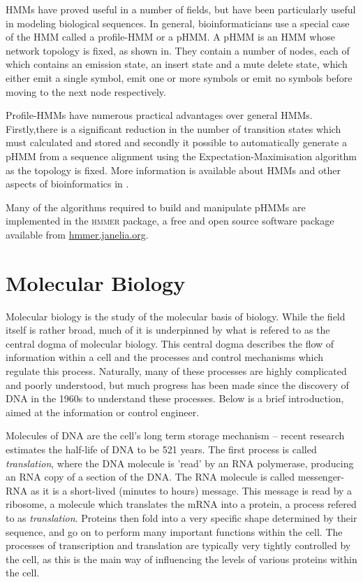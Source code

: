 \documentclass[twoside,a4paper]{article}
\begin{document}
\begin{multicols}{2}
HMMs have proved useful in a number of fields, but have been particularly
useful in modeling biological sequences. 
In general, bioinformaticians use a special case of the HMM called a
profile-HMM or a pHMM.
A pHMM is an HMM whose network topology is fixed, as shown in.
They contain a number of nodes, each of which contains an emission state, an
insert state and a mute delete state, which either emit a single symbol, emit
one or more symbols or emit no symbols before moving to the next node
respectively.

Profile-HMMs have numerous practical advantages over general HMMs. 
Firstly,there is a significant reduction in the number of transition states
which must calculated and stored and secondly it possible to automatically
generate a pHMM from a sequence alignment using the Expectation-Maximisation
algorithm as the topology is fixed. More information is available about HMMs
and other aspects of bioinformatics in \cite{Durbin1998}.

Many of the algorithms required to build and manipulate pHMMs are implemented
in the \textsc{hmmer}\cite{HMMERguide} package, a free and open source software 
package available from \href{http://hmmer.janelia.org/}{hmmer.janelia.org}.

\section{Molecular Biology}
\label{sec:mbio}

Molecular biology is the study of the molecular basis of biology.
While the field itself is rather broad, much of it is underpinned by what is
refered to as the central dogma of molecular biology.
This central dogma describes the flow of information within a cell and the
processes and control mechanisms which regulate this process.
Naturally, many of these processes are highly complicated and poorly
understood, but much progress has been made since the discovery of DNA in the
1960s to understand these processes.
Below is a brief introduction, aimed at the information or control engineer.

Molecules of DNA are the cell's long term storage mechanism -- recent research
estimates the half-life of DNA to be 521 years\cite{DNAhalflife}.
The first process is called \textit{translation}, where the DNA molecule is
'read' by an RNA polymerase, producing an RNA copy of a section of the DNA.
The RNA molecule is called messenger-RNA as it is a short-lived (minutes to
hours) message.
This message is read by a ribosome, a molecule which translates the mRNA into a
protein, a process refered to as \textit{translation}.
Proteins then fold into a very specific shape determined by their 
sequence, and go on to perform many important functions within the cell.
The processes of transcription and translation are typically very tightly
controlled by the cell, as this is the main way of influencing the levels of
various proteins within the cell.


\end{multicols}
\end{document}
